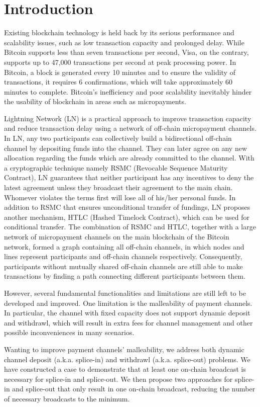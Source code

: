 \section{Introduction}
\label{sec:introduction}


Existing blockchain technology is held back by its serious performance and scalability issues, such as low transaction capacity and prolonged delay. While Bitcoin\cite{nakamoto2008bitcoin} supports less than seven transactions per second, Visa, on the contrary, supports up to 47,000 transactions per second at peak processing power. In Bitcoin, a block is generated every 10 minutes and to ensure the validity of transactions, it requires 6 confirmations, which will take approximately 60 minutes to complete. Bitcoin’s inefficiency and poor scalability inevitably hinder the usability of blockchain in areas such as micropayments.
 
Lightning Network (LN)\cite{poon2015bitcoin} is a practical approach to improve transaction capacity and reduce transaction delay using a network of off-chain micropayment channels\cite{DBLP:journals/corr/LindEPS16}. In LN, any two participants can collectively build a bidirectional off-chain channel by depositing funds into the channel. They can later agree on any new allocation regarding the funds which are already committed to the channel. With a cryptographic technique namely RSMC (Revocable Sequence Maturity Contract), LN guarantees that neither participant has any incentives to deny the latest agreement unless they broadcast their agreement to the main chain. Whomever violates the terms first will lose all of his/her personal funds. In addition to RSMC that ensures unconditional transfer of fundings, LN proposes another mechanism, HTLC (Hashed Timelock Contract), which can be used for conditional transfer. The combination of RSMC and HTLC, together with a large network of micropayment channels on the main blockchain of the Bitcoin network, formed a graph containing all off-chain channels, in which nodes and lines represent participants and off-chain channels respectively. Consequently, participants without mutually shared off-chain channels are still able to make transactions by finding a path connecting different participants between them.

However, several fundamental functionalities and limitations are still left to be developed and improved. One limitation is the malleability of payment channels. In particular, the channel with fixed capacity does not support dynamic deposit and withdrawl, which will result in extra fees for channel management and other possible inconveniences in many scenarios.

Wanting to improve payment channels’ malleability, we address both dynamic channel deposit (a.k.a. splice-in) and withdrawl (a.k.a. splice-out) problems. We have constructed a case to demonstrate that at least one on-chain broadcast is necessary for splice-in and splice-out. We then propose two approaches for splice-in and splice-out that only result in one on-chain broadcast, reducing the number of necessary broadcasts to the minimum.